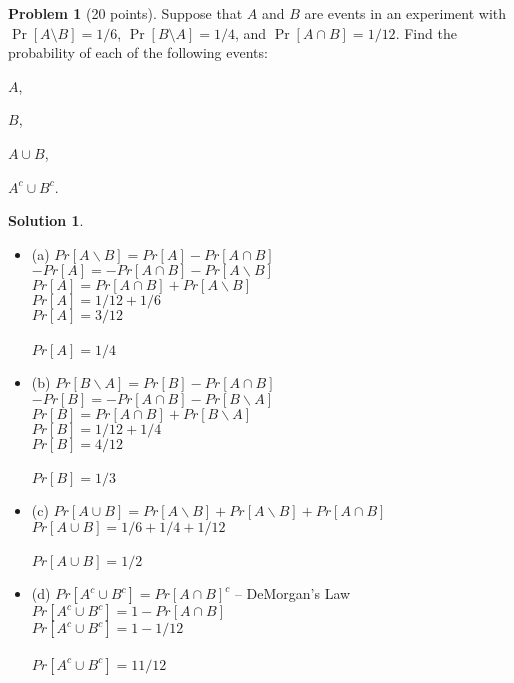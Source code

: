 \documentclass{article}
\theoremstyle{definition}
\newtheorem{problem}{Problem}
\newtheorem*{solution}{Solution}
\begin{document}
\newpage

\begin{problem}[20 points] 
Suppose that $A$ and $B$ are events in an experiment with $\Pr[ A
\setminus B] = 1/6$, $\Pr[B\setminus A]=1/4$, and $\Pr[ A\cap B] = 1/12$. Find the
probability of each of the following events:
\begin{compactenum}[(a)]
\item $A$,
\item $B$,
\item $A\cup B$,
\item $A^c \cup B^c$. 
\end{compactenum}
\end{problem}
\begin{solution} \\

\begin{itemize}
    \item (a) $Pr[A \backslash B] = Pr[A] - Pr[A \cap B]$\\
    $ - Pr[A] =  - Pr[A \cap B] - Pr[A \backslash B]$\\
    $ Pr[A] =  Pr[A \cap B] + Pr[A \backslash B]$\\
    $ Pr[A] = 1/12 + 1/6$\\
    $ Pr[A] = 3/12$\\
    \\
    $ Pr[A] = 1/4$\\
    
    \item (b)
    $Pr[B \backslash A] = Pr[B] - Pr[A \cap B]$\\
    $ - Pr[B] =  - Pr[A \cap B] - Pr[B \backslash A]$\\
    $ Pr[B] =  Pr[A \cap B] + Pr[B \backslash A]$\\
    $ Pr[B] = 1/12 + 1/4$\\
    $ Pr[B] = 4/12$\\
    \\
     $ Pr[B] = 1/3$\\
     
     \item (c) 
     $Pr[A \cup B] = Pr[A \backslash B] + Pr[A \backslash B] + Pr[A \cap B]$\\
     $Pr[A \cup B] = 1/6 + 1/4 + 1/12$\\
     \\
     $Pr[A \cup B] = 1/2$\\
     
     \item (d) $Pr[A^c \cup B^c] = Pr[A \cap B]^c$ -- DeMorgan's Law \\
     $Pr[A^c \cup B^c] = 1 - Pr[A \cap B]$\\
     $Pr[A^c \cup B^c] = 1 - 1/12$\\
     \\
     $Pr[A^c \cup B^c] = 11/12$\\
     
    
\end{itemize}

\end{solution}
\end{document}
